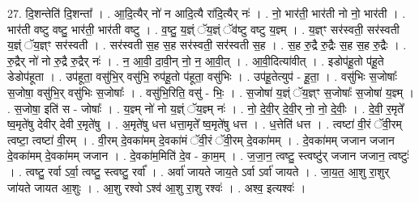 \documentclass[17pt]{extarticle}
\begin{document}
27. दि॒शन्तेति॑ दि॒शन्ता᳚ । . आ॒दि॒त्यैर् नो॑ न आदि॒त्यै रा॑दि॒त्यैर् नः॑ । . नो॒ भार॑ती॒ भार॑ती नो नो॒ भार॑ती । . भार॑ती वष्टु वष्टु॒ भार॑ती॒ भार॑ती वष्टु । . व॒ष्टु॒ य॒ज्ञ्ं ॅय॒ज्ञ्ं ॅव॑ष्टु वष्टु य॒ज्ञ्म् । . य॒ज्ञ्ꣳ सर॑स्वती॒ सर॑स्वती य॒ज्ञ्ं ॅय॒ज्ञ्ꣳ सर॑स्वती । . सर॑स्वती स॒ह स॒ह सर॑स्वती॒ सर॑स्वती स॒ह । . स॒ह रु॒द्रै रु॒द्रैः स॒ह स॒ह रु॒द्रैः । . रु॒द्रैर् नो॑ नो रु॒द्रै रु॒द्रैर् नः॑ । . न॒ आ॒वी॒ दा॒वी॒न् नो॒ न॒ आ॒वी॒त् । . आ॒वी॒दित्या॑वीत् । . इडोप॑हू॒तो प॑हू॒ते डेडोप॑हूता । . उप॑हूता॒ वसु॑भि॒र् वसु॑भि॒ रुप॑हू॒तो प॑हूता॒ वसु॑भिः । . उप॑हू॒तेत्युप॑ - हू॒ता॒ । . वसु॑भिः स॒जोषाः᳚ स॒जोषा॒ वसु॑भि॒र् वसु॑भिः स॒जोषाः᳚ । . वसु॑भि॒रिति॒ वसु॑ - भिः॒ । . स॒जोषा॑ य॒ज्ञ्ं ॅय॒ज्ञ्ꣳ स॒जोषाः᳚ स॒जोषा॑ य॒ज्ञ्म् । . स॒जोषा॒ इति॑ स - जोषाः᳚ । . य॒ज्ञ्म् नो॑ नो य॒ज्ञ्ं ॅय॒ज्ञ्म् नः॑ । . नो॒ दे॒वी॒र् दे॒वी॒र् नो॒ नो॒ दे॒वीः॒ । . दे॒वी॒ र॒मृते᳚ ष्व॒मृते॑षु देवीर् देवी र॒मृते॑षु । . अ॒मृते॑षु धत्त धत्ता॒मृते᳚ ष्व॒मृते॑षु धत्त । . ध॒त्तेति॑ धत्त । . त्वष्टा॑ वी॒रं ॅवी॒रम् त्वष्टा॒ त्वष्टा॑ वी॒रम् । . वी॒रम् दे॒वका॑मम् दे॒वका॑मं ॅवी॒रं ॅवी॒रम् दे॒वका॑मम् । . दे॒वका॑मम् जजान जजान दे॒वका॑मम् दे॒वका॑मम् जजान । . दे॒वका॑म॒मिति॑ दे॒व - का॒म॒म् । . ज॒जा॒न॒ त्वष्टु॒ स्त्वष्टु॑र् जजान जजान॒ त्वष्टुः॑ । . त्वष्टु॒ रर्वा ऽर्वा॒ त्वष्टु॒ स्त्वष्टु॒ रर्वा᳚ । . अर्वा॑ जायते जाय॒ते ऽर्वा ऽर्वा॑ जायते । . जा॒य॒त॒ आ॒शु रा॒शुर् जा॑यते जायत आ॒शुः । . आ॒शु रश्वो ऽश्व॑ आ॒शु रा॒शु रश्वः॑ । . अश्व॒ इत्यश्वः॑ । \newline
\end{document}
